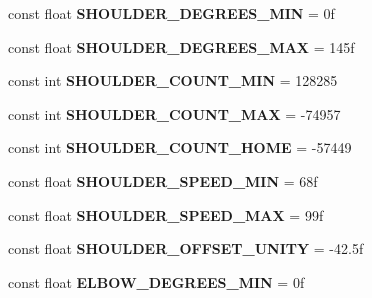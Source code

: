 \begin{DoxyCompactItemize}
\item 
\mbox{\label{class_scorbot_e_r_i_x_v2_a1ca8ffba19b46001f02925055746a027}} 
const float {\bfseries S\+H\+O\+U\+L\+D\+E\+R\+\_\+\+D\+E\+G\+R\+E\+E\+S\+\_\+\+M\+IN} = 0f
\item 
\mbox{\label{class_scorbot_e_r_i_x_v2_a9fdc19f50ad0e8214cd0ed21f13c3a2b}} 
const float {\bfseries S\+H\+O\+U\+L\+D\+E\+R\+\_\+\+D\+E\+G\+R\+E\+E\+S\+\_\+\+M\+AX} = 145f
\item 
\mbox{\label{class_scorbot_e_r_i_x_v2_ab24cd25c95f5a8407a59154599c55360}} 
const int {\bfseries S\+H\+O\+U\+L\+D\+E\+R\+\_\+\+C\+O\+U\+N\+T\+\_\+\+M\+IN} = 128285
\item 
\mbox{\label{class_scorbot_e_r_i_x_v2_aff488565f33e32fad7a2c520e8fef780}} 
const int {\bfseries S\+H\+O\+U\+L\+D\+E\+R\+\_\+\+C\+O\+U\+N\+T\+\_\+\+M\+AX} = -\/74957
\item 
\mbox{\label{class_scorbot_e_r_i_x_v2_ad9ab24df5d53bad53622b3681f328ba6}} 
const int {\bfseries S\+H\+O\+U\+L\+D\+E\+R\+\_\+\+C\+O\+U\+N\+T\+\_\+\+H\+O\+ME} = -\/57449
\item 
\mbox{\label{class_scorbot_e_r_i_x_v2_a63c6fc30557a3380c383ed981d38f9b0}} 
const float {\bfseries S\+H\+O\+U\+L\+D\+E\+R\+\_\+\+S\+P\+E\+E\+D\+\_\+\+M\+IN} = 68f
\item 
\mbox{\label{class_scorbot_e_r_i_x_v2_aa8d665894e97bd00dd41a1746382da61}} 
const float {\bfseries S\+H\+O\+U\+L\+D\+E\+R\+\_\+\+S\+P\+E\+E\+D\+\_\+\+M\+AX} = 99f
\item 
\mbox{\label{class_scorbot_e_r_i_x_v2_a406081289598ba199ebb73f4a7025094}} 
const float {\bfseries S\+H\+O\+U\+L\+D\+E\+R\+\_\+\+O\+F\+F\+S\+E\+T\+\_\+\+U\+N\+I\+TY} = -\/42.\+5f
\item 
\mbox{\label{class_scorbot_e_r_i_x_v2_aefe0a0c7b447e544a6dfb26f905a14fe}} 
const float {\bfseries E\+L\+B\+O\+W\+\_\+\+D\+E\+G\+R\+E\+E\+S\+\_\+\+M\+IN} = 0f
\item 

\end{DoxyCompactItemize}
